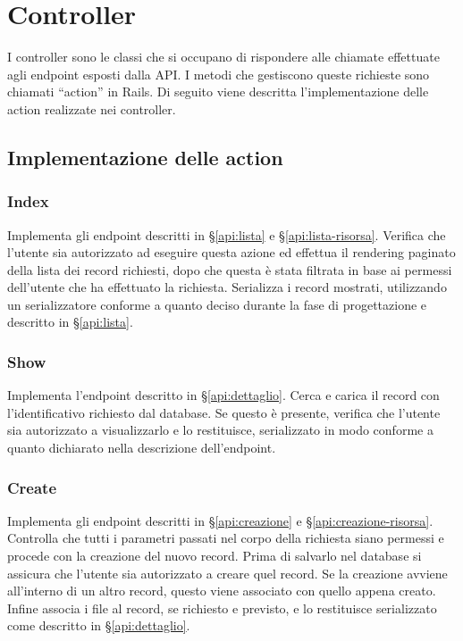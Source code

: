 \section{Controller}
I controller sono le classi che si occupano di rispondere alle chiamate effettuate agli endpoint esposti dalla API. I metodi che gestiscono queste richieste sono chiamati ``action'' in Rails. Di seguito viene descritta l'implementazione delle action realizzate nei controller.

\subsection{Implementazione delle action}
\subsubsection{Index}
Implementa gli endpoint descritti in \S \ref{api:lista} e \S \ref{api:lista-risorsa}. Verifica che l'utente sia autorizzato ad eseguire questa azione ed effettua il rendering paginato della lista dei record richiesti, dopo che questa è stata filtrata in base ai permessi dell'utente che ha effettuato la richiesta. Serializza i record mostrati, utilizzando un serializzatore conforme a quanto deciso durante la fase di progettazione e descritto in \S \ref{api:lista}.

\subsubsection{Show}
Implementa l'endpoint descritto in \S \ref{api:dettaglio}. Cerca e carica il record con l'identificativo richiesto dal database. Se questo è presente, verifica che l'utente sia autorizzato a visualizzarlo e lo restituisce, serializzato in modo conforme a quanto dichiarato nella descrizione dell'endpoint.

\subsubsection{Create}
Implementa gli endpoint descritti in \S \ref{api:creazione} e \S \ref{api:creazione-risorsa}. Controlla che tutti i parametri passati nel corpo della richiesta siano permessi e procede con la creazione del nuovo record. Prima di salvarlo nel database si assicura che l'utente sia autorizzato a creare quel record. Se la creazione avviene all'interno di un altro record, questo viene associato con quello appena creato. Infine associa i file al record, se richiesto e previsto, e lo restituisce serializzato come descritto in \S \ref{api:dettaglio}.

